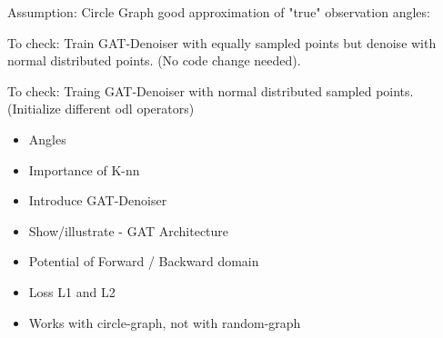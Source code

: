 Assumption:
Circle Graph good approximation of "true" observation angles:

To check:
Train GAT-Denoiser with equally sampled points but denoise with
normal distributed points.
(No code change needed).

To check:
Traing GAT-Denoiser with normal distributed sampled points.
(Initialize different odl operators)



\begin{itemize}
  \item Angles 
  \item Importance of K-nn 
  \item Introduce GAT-Denoiser
  \item Show/illustrate - GAT Architecture
  \item Potential of Forward / Backward domain
  \item Loss L1 and L2
  \item Works with circle-graph, not with random-graph
\end{itemize}